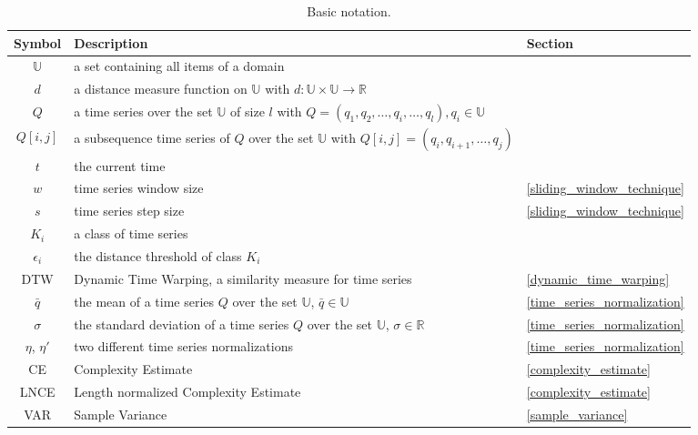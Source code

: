 \begin{table}
    \begin{center}
        \begin{tabularx}{\textwidth}{c X l}
            \hline
            \textbf{Symbol} \qquad & \textbf{Description} & \qquad \textbf{Section}\\
            \hline
            $\mathbb{U}$ & a set containing all items of a domain & \qquad\\
            $d$ & a distance measure function on $\mathbb{U}$ with $d: \mathbb{U} \times \mathbb{U} \to \mathbb{R}$
                & \qquad\\
            $Q$ & a time series over the set $\mathbb{U}$ of size $l$ with
                $Q = (q_1, q_2, \dots, q_i, \dots, q_l), q_i \in \mathbb{U}$ & \qquad\\
            $Q[i,j]$ & a subsequence time series of $Q$ over the set $\mathbb{U}$ with
                $Q[i,j] = (q_i, q_{i+1}, \dots, q_{j})$ & \qquad\\
            $t$ & the current time & \qquad\\
            $w$ & time series window size & \qquad \ref{sliding_window_technique}\\
            $s$ & time series step size & \qquad \ref{sliding_window_technique}\\
            $K_i$ & a class of time series & \qquad\\
            $\epsilon_i$ & the distance threshold of class $K_i$ & \qquad\\
            DTW & Dynamic Time Warping, a similarity measure for time series & \qquad \ref{dynamic_time_warping}\\
            $\bar{q}$ & the mean of a time series $Q$ over the set $\mathbb{U}$, $\bar{q} \in \mathbb{U}$ & \qquad
                \ref{time_series_normalization}\\
            $\sigma$ & the standard deviation of a time series $Q$ over the set $\mathbb{U}$, $\sigma \in \mathbb{R}$ &
                \qquad \ref{time_series_normalization}\\
            $\eta$, $\eta '$  & two different time series normalizations & \qquad \ref{time_series_normalization}\\
            CE & Complexity Estimate & \qquad \ref{complexity_estimate}\\
            LNCE & Length normalized Complexity Estimate & \qquad \ref{complexity_estimate}\\
            VAR & Sample Variance & \qquad \ref{sample_variance}\\
            \hline
        \end{tabularx}
    \end{center}
    \caption{Basic notation.}
	\label{tab:notation}
\end{table}






